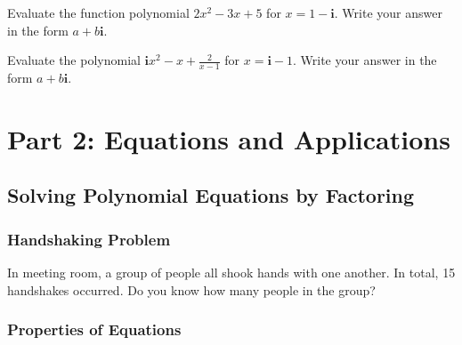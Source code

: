 \documentclass[
  en,11pt]{elegantbook}
\newcommand{\ii}{\mathbf{i}}
\newcommand{\size}[2]{{\fontsize{#1}{0}\selectfont#2}}
\newenvironment{rmdthink}{
	\vspace*{0.5\baselineskip}
	\par\noindent
	\makebox[-4pt][r]{\color{green!90}\size{12}{\faLightbulbO}\,\,}
    \begin{tcolorbox}[
    enhanced,
    title={\textbf{\color{second}Think}},
    title style={left color=blue!10!green!20!white,right color=yellow!20!blue!20!white},
    colback=green!20!white,
    ]
    \sffamily
}{
    \end{tcolorbox}
	\par\ignorespacesafterend
}
\let\BeginKnitrBlock\begin \let\EndKnitrBlock\end
\begin{document}
\BeginKnitrBlock{exercise}
\protect\hypertarget{exr:unnamed-chunk-110}{}{\label{exr:unnamed-chunk-110} }
Evaluate the function polynomial \(2x^2-3x+5\) for \(x=1-\ii\).
Write your answer in the form \(a+b\ii\).
\EndKnitrBlock{exercise}

\BeginKnitrBlock{exercise}
\protect\hypertarget{exr:unnamed-chunk-111}{}{\label{exr:unnamed-chunk-111} }
Evaluate the polynomial \(\ii x^2-x+\frac{2}{x-1}\) for \(x=\ii-1\).
Write your answer in the form \(a+b\ii\).
\EndKnitrBlock{exercise}

\hypertarget{part-part-2-equations-and-applications}{%
\part*{Part 2: Equations and Applications}\label{part-part-2-equations-and-applications}}

\hypertarget{solving-polynomial-equations-by-factoring}{%
\chapter{Solving Polynomial Equations by Factoring}\label{solving-polynomial-equations-by-factoring}}

\hypertarget{handshaking-problem}{%
\section{Handshaking Problem}\label{handshaking-problem}}

\begin{rmdthink}

In meeting room, a group of people all shook hands with one another. In total, 15 handshakes occurred. Do you know how many people in the group?

\end{rmdthink}

\hypertarget{properties-of-equations}{%
\section{Properties of Equations}\label{properties-of-equations}}
\end{document}
